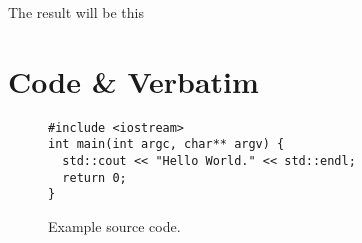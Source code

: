The result will be this \cite{uci-thesis-latex_original}

\section{Code \& Verbatim}
\begin{figure}[H]
\begin{verbatim}
#include <iostream>
int main(int argc, char** argv) {
  std::cout << "Hello World." << std::endl;
  return 0;
}
\end{verbatim}
  \caption{Example source code.}
  \label{fig:sourcecode}
\end{figure}


